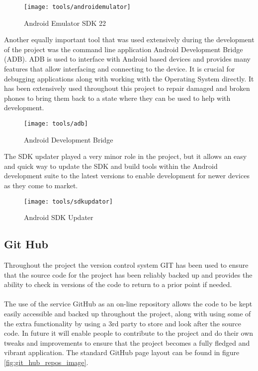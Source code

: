 \begin{figure}[H]
    \centering
    \texttt{[image: tools/androidemulator]}
    \caption{Android Emulator SDK 22}
    \label{fig:android_emulator}
\end{figure} 

\label{sec:adb}
\noindent
Another equally important tool that was used extensively during the development of the project was the command line application Android Development Bridge (ADB). ADB is used to interface with Android based devices and provides many features that allow interfacing and connecting to the device. It is crucial for debugging applications along with working with the Operating System directly. It has been extensively used throughout this project to repair damaged and broken phones to bring them back to a state where they can be used to help with development.

\begin{figure}[H]
    \centering
    \texttt{[image: tools/adb]}
    \caption{Android Development Bridge}
    \label{fig:adb_image}
\end{figure} 

\noindent
The SDK updater played a very minor role in the project, but it allows an easy and quick way to update the SDK and build tools within the Android development suite to the latest versions to enable development for newer devices as they come to market.

\begin{figure}[H]
    \centering
    \texttt{[image: tools/sdkupdator]}
    \caption{Android SDK Updater}
    \label{fig:sdk_updator}
\end{figure} 

\subsection*{Git Hub}

Throughout the project the version control system GIT has been used to ensure that the source code for the project has been reliably backed up and provides the ability to check in versions of the code to return to a prior point if needed.\\
\\
The use of the service GitHub as an on-line repository allows the code to be kept easily accessible and backed up throughout the project, along with using some of the extra functionality by using a 3rd party to store and look after the source code. In future it will enable people to contribute to the project and do their own tweaks and improvements to ensure that the project becomes a fully fledged and vibrant application. The standard GitHub page layout can be found in figure \ref{fig:git_hub_repos_image}.


